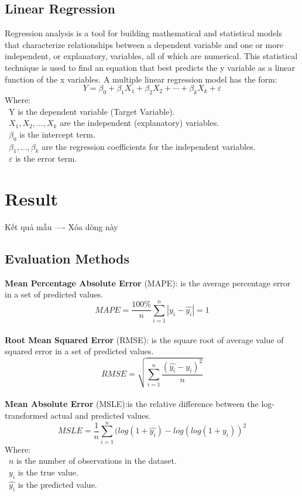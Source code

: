 \documentclass{ieeeojies}
\begin{document}
\subsection{Linear Regression}
Regression analysis is a tool for building mathematical and statistical models that characterize relationships between a dependent variable and one or more independent, or explanatory, variables, all of which are numerical. This statistical technique is used to find an equation that best predicts the y variable as a linear function of the x variables.
A multiple linear regression model has the form: 
\[Y=\beta_0+\beta_1X_1+\beta_2X_2+\cdots+\beta_kX_k+\varepsilon\]
Where:\\
	\indent\textbullet\ Y is the dependent variable (Target Variable).\\
	\indent\textbullet\ \(X_1, X_2, \ldots, X_k\) are the independent (explanatory) variables.\\
	\indent\textbullet\ \(\beta_0\) is the intercept term.\\
	\indent\textbullet\ \(\beta_1,..., \beta_k\) are the regression coefficients for the independent variables.\\
	\indent\textbullet\ \(\varepsilon\) is the error term.
 

\section{Result}
Kết quả mẫu ---- Xóa dòng này
\subsection{Evaluation Methods}
\textbf{Mean Percentage Absolute Error} (MAPE): is the average percentage error in a set of predicted values.\\
\[MAPE=\frac{100\%}{n}  \sum_{i=1}^{n} |y_i-\hat{y_i} |  = 1 \]\\
\textbf{Root Mean Squared Error} (RMSE): is the square root of average value of squared error in a set of predicted values.\\
\[RMSE=\sqrt{\sum_{i=1}^{n} \frac{(\hat{y_i}-y_i )^2}{n} }\]\\
\textbf{Mean Absolute Error} (MSLE):is the relative difference between the log-transformed actual and predicted values.\\
\[MSLE=\frac{1}{n}\sum_{i=1}^{n}(log(1+\hat{y_i})-log(log(1+y_i))^2\]
Where: \\
	\indent\textbullet\ \(n\) is the number of observations in the dataset.\\
	\indent\textbullet\ \(y_i\)  is the true value.\\
	\indent\textbullet\ \(\hat{y_i}\) is the predicted value.
\end{document}
